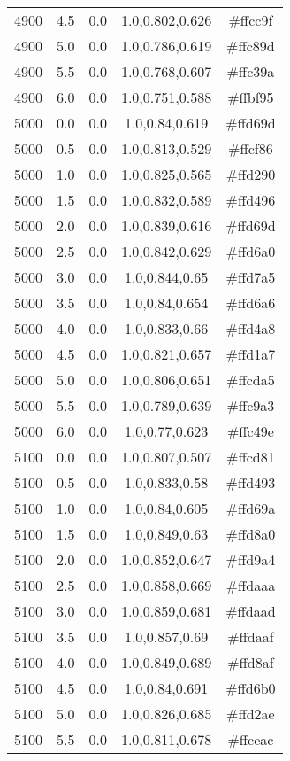 \begin{tabular}{ccccc}
4900 & 4.5 & 0.0 & 1.0,0.802,0.626 & \#ffcc9f \\ 
4900 & 5.0 & 0.0 & 1.0,0.786,0.619 & \#ffc89d \\ 
4900 & 5.5 & 0.0 & 1.0,0.768,0.607 & \#ffc39a \\ 
4900 & 6.0 & 0.0 & 1.0,0.751,0.588 & \#ffbf95 \\ 
5000 & 0.0 & 0.0 & 1.0,0.84,0.619 & \#ffd69d \\ 
5000 & 0.5 & 0.0 & 1.0,0.813,0.529 & \#ffcf86 \\ 
5000 & 1.0 & 0.0 & 1.0,0.825,0.565 & \#ffd290 \\ 
5000 & 1.5 & 0.0 & 1.0,0.832,0.589 & \#ffd496 \\ 
5000 & 2.0 & 0.0 & 1.0,0.839,0.616 & \#ffd69d \\ 
5000 & 2.5 & 0.0 & 1.0,0.842,0.629 & \#ffd6a0 \\ 
5000 & 3.0 & 0.0 & 1.0,0.844,0.65 & \#ffd7a5 \\ 
5000 & 3.5 & 0.0 & 1.0,0.84,0.654 & \#ffd6a6 \\ 
5000 & 4.0 & 0.0 & 1.0,0.833,0.66 & \#ffd4a8 \\ 
5000 & 4.5 & 0.0 & 1.0,0.821,0.657 & \#ffd1a7 \\ 
5000 & 5.0 & 0.0 & 1.0,0.806,0.651 & \#ffcda5 \\ 
5000 & 5.5 & 0.0 & 1.0,0.789,0.639 & \#ffc9a3 \\ 
5000 & 6.0 & 0.0 & 1.0,0.77,0.623 & \#ffc49e \\ 
5100 & 0.0 & 0.0 & 1.0,0.807,0.507 & \#ffcd81 \\ 
5100 & 0.5 & 0.0 & 1.0,0.833,0.58 & \#ffd493 \\ 
5100 & 1.0 & 0.0 & 1.0,0.84,0.605 & \#ffd69a \\ 
5100 & 1.5 & 0.0 & 1.0,0.849,0.63 & \#ffd8a0 \\ 
5100 & 2.0 & 0.0 & 1.0,0.852,0.647 & \#ffd9a4 \\ 
5100 & 2.5 & 0.0 & 1.0,0.858,0.669 & \#ffdaaa \\ 
5100 & 3.0 & 0.0 & 1.0,0.859,0.681 & \#ffdaad \\ 
5100 & 3.5 & 0.0 & 1.0,0.857,0.69 & \#ffdaaf \\ 
5100 & 4.0 & 0.0 & 1.0,0.849,0.689 & \#ffd8af \\ 
5100 & 4.5 & 0.0 & 1.0,0.84,0.691 & \#ffd6b0 \\ 
5100 & 5.0 & 0.0 & 1.0,0.826,0.685 & \#ffd2ae \\ 
5100 & 5.5 & 0.0 & 1.0,0.811,0.678 & \#ffceac \\ 

\end{tabular}
